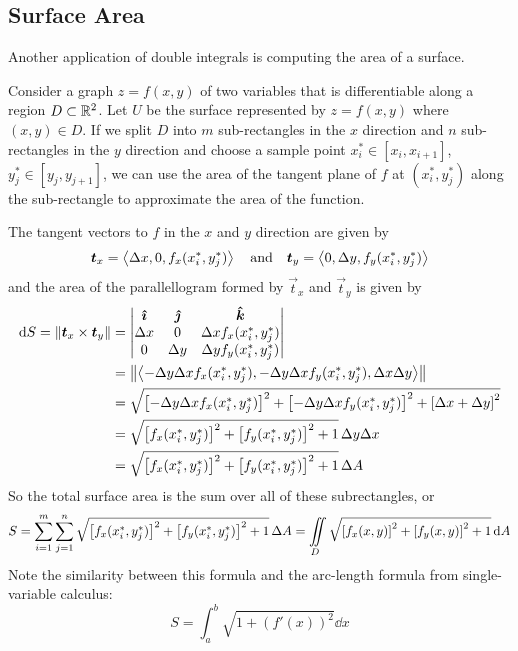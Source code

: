 \subsection{Surface Area}
Another application of double integrals is computing the area of a surface. \par
Consider a graph $z=f(x,y)$ of two variables that is differentiable along a region $D\subset \mathbb{R}^2$. Let $U$ be the surface represented by $z=f(x,y)$ where $(x,y)\in D$. If we split $D$ into $m$ sub-rectangles in the $x$ direction and $n$ sub-rectangles in the $y$ direction and choose a sample point $x_i^*\in[x_i,x_{i+1}]$, $y_j^*\in[y_j, y_{j+1}]$, we can use the area of the tangent plane of $f$ at $(x_i^*, y_j^*)$ along the sub-rectangle to approximate the area of the function. \par
The tangent vectors to $f$ in the $x$ and $y$ direction are given by 
\[ \boldsymbol{t}_x = \left\langle \Delta x, 0, f_x(x_i^*, y_j^*)\right\rangle\quad\text{and}\quad \boldsymbol{t}_y = \left\langle 0, \Delta y, f_y(x_i^*, y_j^*) \right\rangle \]
and the area of the parallellogram formed by $\vec t_x$ and $\vec t_y$ is given by 
\begin{align*}
    \dd S = \norm{\vec t_x\times \vec t_y}  &= \begin{vmatrix}
        \ihat & \jhat & \khat \\
        \Delta x & 0 & \Delta xf_x(x_i^*, y_j^*) \\
        0 & \Delta y & \Delta yf_y(x_i^*, y_j^*)
    \end{vmatrix} \\
    &= \norm{\< -\Delta y\Delta xf_x(x_i^*, y_j^*), -\Delta y\Delta xf_y(x_i^*, y_j^*), \Delta x\Delta y \>} \\
    &= \sqrt{\bqty{-\Delta y \Delta xf_x(x_i^*, y_j^*)}^2 + \bqty{-\Delta y\Delta xf_y(x_i^*, y_j^*)}^2 + \bqty{\Delta x + \Delta y}^2} \\
    &= \sqrt{\bqty{f_x(x_i^*, y_j^*)}^2 + \bqty{f_y(x_i^*, y_j^*)}^2 + 1}\, \Delta y\Delta x \\
    &= \sqrt{\bqty{f_x(x_i^*, y_j^*)}^2 + \bqty{f_y(x_i^*, y_j^*)}^2 + 1}\, \Delta A
\end{align*}
So the total surface area is the sum over all of these subrectangles, or
\[ S = \sum_{i=1}^m\sum_{j=1}^n \sqrt{\bqty{f_x(x_i^*, y_j^*)}^2 + \bqty{f_y(x_i^*, y_j^*)}^2 + 1}\, \Delta A = \iint\limits_D \sqrt{\bqty{f_x(x,y)}^2 + \bqty{f_y(x,y)}^2 + 1}\, \dd A\]
Note the similarity between this formula and the arc-length formula from single-variable calculus:
\[ S = \int_a^b\sqrt{1+(f'(x))^2}\dd x \]

